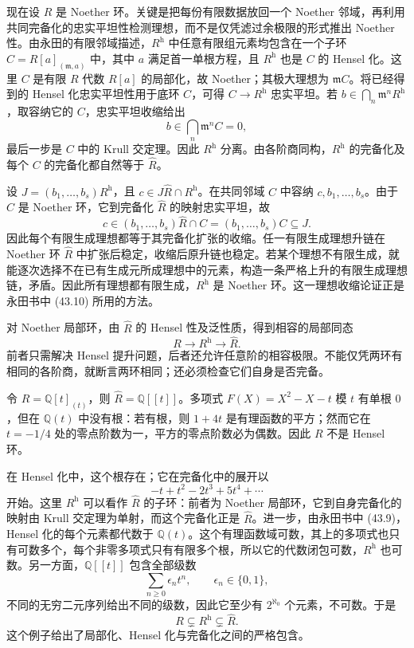 \begin{proofsketch}
	现在设 \(R\) 是 Noether 环。关键是把每份有限数据放回一个 Noether 邻域，再利用共同完备化的忠实平坦性检测理想，而不是仅凭滤过余极限的形式推出 Noether 性。由永田的有限邻域描述，\(R^{\mathrm h}\) 中任意有限组元素均包含在一个子环 \(C=R[a]_{(\mathfrak m,a)}\) 中，其中 \(a\) 满足首一单根方程，且 \(R^{\mathrm h}\) 也是 \(C\) 的 Hensel 化\cite[(43.9), pp. 182--183]{Nagata1975LocalRings}。这里 \(C\) 是有限 \(R\) 代数 \(R[a]\) 的局部化，故 Noether；其极大理想为 \(\mathfrak mC\)。将已经得到的 Hensel 化忠实平坦性用于底环 \(C\)，可得 \(C\to R^{\mathrm h}\) 忠实平坦。若 \(b\in\bigcap_n\mathfrak m^nR^{\mathrm h}\)，取容纳它的 \(C\)，忠实平坦收缩给出
	\[
		b\in\bigcap_n\mathfrak m^nC=0,
	\]
	最后一步是 \(C\) 中的 Krull 交定理。因此 \(R^{\mathrm h}\) 分离。由各阶商同构，\(R^{\mathrm h}\) 的完备化及每个 \(C\) 的完备化都自然等于 \(\widehat R\)。

	设 \(J=(b_1,\ldots,b_s)R^{\mathrm h}\)，且 \(c\in J\widehat R\cap R^{\mathrm h}\)。在共同邻域 \(C\) 中容纳 \(c,b_1,\ldots,b_s\)。由于 \(C\) 是 Noether 环，它到完备化 \(\widehat R\) 的映射忠实平坦，故
	\[
		c\in(b_1,\ldots,b_s)\widehat R\cap C =(b_1,\ldots,b_s)C\subseteq J.
	\]
	因此每个有限生成理想都等于其完备化扩张的收缩。任一有限生成理想升链在 Noether 环 \(\widehat R\) 中扩张后稳定，收缩后原升链也稳定。若某个理想不有限生成，就能逐次选择不在已有生成元所成理想中的元素，构造一条严格上升的有限生成理想链，矛盾。因此所有理想都有限生成，\(R^{\mathrm h}\) 是 Noether 环。这一理想收缩论证正是永田书中 (43.10) 所用的方法\cite[p. 183]{Nagata1975LocalRings}。
\end{proofsketch}

对 Noether 局部环，由 \(\widehat R\) 的 Hensel 性及泛性质，得到相容的局部同态
\[
	R\longrightarrow R^{\mathrm h}\longrightarrow\widehat R.
\]
前者只需解决 Hensel 提升问题，后者还允许任意阶的相容极限。不能仅凭两环有相同的各阶商，就断言两环相同；还必须检查它们自身是否完备。

\begin{example}\label{b3:exm:henselization-not-completion}
	令 \(R=\mathbb Q[t]_{(t)}\)，则 \(\widehat R=\mathbb Q[\![t]\!]\)。多项式 \(F(X)=X^2-X-t\) 模 \(t\) 有单根 \(0\)，但在 \(\mathbb Q(t)\) 中没有根：若有根，则 \(1+4t\) 是有理函数的平方；然而它在 \(t=-1/4\) 处的零点阶数为一，平方的零点阶数必为偶数。因此 \(R\) 不是 Hensel 环。

	\ProseParagraphBreak
	在 Hensel 化中，这个根存在；它在完备化中的展开以
	\[
		-t+t^2-2t^3+5t^4+\cdots
	\]
	开始。这里 \(R^{\mathrm h}\) 可以看作 \(\widehat R\) 的子环：前者为 Noether 局部环，它到自身完备化的映射由 Krull 交定理为单射，而这个完备化正是 \(\widehat R\)。进一步，由永田书中 (43.9)，Hensel 化的每个元素都代数于 \(\mathbb Q(t)\)。这个有理函数域可数，其上的多项式也只有可数多个，每个非零多项式只有有限多个根，所以它的代数闭包可数，\(R^{\mathrm h}\) 也可数。另一方面，\(\mathbb Q[\![t]\!]\) 包含全部级数
	\[
		\sum_{n\ge0}\epsilon_nt^n,\qquad \epsilon_n\in\{0,1\},
	\]
	不同的无穷二元序列给出不同的级数，因此它至少有 \(2^{\aleph_0}\) 个元素，不可数。于是
	\[
		R\subsetneq R^{\mathrm h}\subsetneq\widehat R.
	\]
	这个例子给出了局部化、Hensel 化与完备化之间的严格包含。
\end{example}

